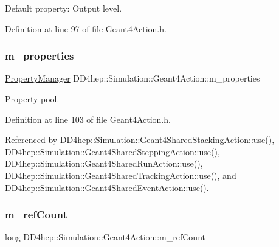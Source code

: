 Default property\+: Output level. 



Definition at line 97 of file Geant4\+Action.\+h.

\hypertarget{class_d_d4hep_1_1_simulation_1_1_geant4_action_a30ee75af74df39aa7b34946c59da17ba}{}\label{class_d_d4hep_1_1_simulation_1_1_geant4_action_a30ee75af74df39aa7b34946c59da17ba} 
\subsubsection{\texorpdfstring{m\+\_\+properties}{m\_properties}}
{\footnotesize\ttfamily \hyperlink{class_d_d4hep_1_1_property_manager}{Property\+Manager} D\+D4hep\+::\+Simulation\+::\+Geant4\+Action\+::m\+\_\+properties\hspace{0.3cm}{\ttfamily [protected]}}



\hyperlink{class_d_d4hep_1_1_property}{Property} pool. 



Definition at line 103 of file Geant4\+Action.\+h.



Referenced by D\+D4hep\+::\+Simulation\+::\+Geant4\+Shared\+Stacking\+Action\+::use(), D\+D4hep\+::\+Simulation\+::\+Geant4\+Shared\+Stepping\+Action\+::use(), D\+D4hep\+::\+Simulation\+::\+Geant4\+Shared\+Run\+Action\+::use(), D\+D4hep\+::\+Simulation\+::\+Geant4\+Shared\+Tracking\+Action\+::use(), and D\+D4hep\+::\+Simulation\+::\+Geant4\+Shared\+Event\+Action\+::use().

\hypertarget{class_d_d4hep_1_1_simulation_1_1_geant4_action_a5ea9f95e6db274a1515b947b4f69da9e}{}\label{class_d_d4hep_1_1_simulation_1_1_geant4_action_a5ea9f95e6db274a1515b947b4f69da9e} 
\subsubsection{\texorpdfstring{m\+\_\+ref\+Count}{m\_refCount}}
{\footnotesize\ttfamily long D\+D4hep\+::\+Simulation\+::\+Geant4\+Action\+::m\+\_\+ref\+Count\hspace{0.3cm}{\ttfamily [protected]}}



